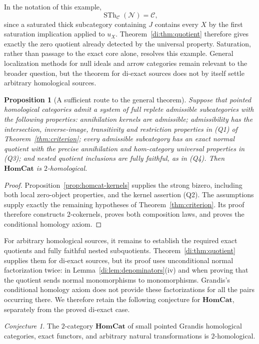 \documentclass[11pt,reqno,a4paper]{amsart}
\newtheorem{proposition}[theorem]{Proposition}
\theoremstyle{definition}
\theoremstyle{remark}
\newcommand{\C}{\mathcal{C}}
\newcommand{\N}{\mathcal{N}}
\newcommand{\0}{\mathbf{0}}
\renewcommand{\1}{\mathbf{1}}
\newtheorem{conjecture}[theorem]{Conjecture}
\newcommand{\HomCat}{\mathbf{HomCat}}
\DeclareMathOperator{\SatTh}{STh}
\begin{document}
In the notation of this example,
\[
 \SatTh_{\C}(\N)=\C,
\]
since a saturated thick subcategory containing $J$ contains every
$X$ by the first saturation implication applied to $u_X$.
Theorem~\ref{di:thm:quotient} therefore gives exactly the zero quotient
already detected by the universal property. Saturation, rather than
passage to the exact core alone, resolves this example. General
localization methods for null ideals and arrow categories
\cite{Fritz} remain relevant to the broader question, but the theorem
for di-exact sources does not by itself settle arbitrary homological
sources.

\begin{proposition}[A sufficient route to the general theorem]\label{prop:homcat-conditional}
Suppose that pointed homological categories admit a system of full
replete admissible subcategories with the following properties:
annihilation kernels are admissible; admissibility has the
intersection, inverse-image, transitivity and restriction properties
in \textup{(Q1)} of Theorem~\ref{thm:criterion}; every admissible
subcategory has an exact normal quotient with the precise
annihilation and hom-category universal properties in \textup{(Q3)};
and nested quotient inclusions are fully faithful, as in
\textup{(Q4)}. Then $\HomCat$ is $2$-homological.
\end{proposition}
\begin{proof}
Proposition~\ref{prop:homcat-kernels} supplies the strong bizero,
including both local zero-object properties, and the kernel
assertion (Q2). The assumptions supply exactly the
remaining hypotheses of Theorem~\ref{thm:criterion}. Its proof
therefore constructs $2$-cokernels, proves both composition laws,
and proves the conditional homology axiom. 
\end{proof}

For arbitrary homological sources, it remains to establish the
required exact quotients and fully faithful nested subquotients.
Theorem~\ref{di:thm:quotient} supplies them for di-exact sources,
but its proof uses unconditional normal factorization twice:
in Lemma~\ref{di:lem:denominators}(iv) and when proving that the
quotient sends normal monomorphisms to monomorphisms. Grandis's
conditional homology axiom does not provide these factorizations for
all the pairs occurring there. We therefore retain the following
conjecture for $\HomCat$, separately from the proved di-exact case.

\begin{conjecture}\label{conj:homcat}
The $2$-category $\HomCat$ of small pointed Grandis homological
categories, exact functors, and arbitrary natural transformations
is $2$-homological.
\end{conjecture}
\end{document}
